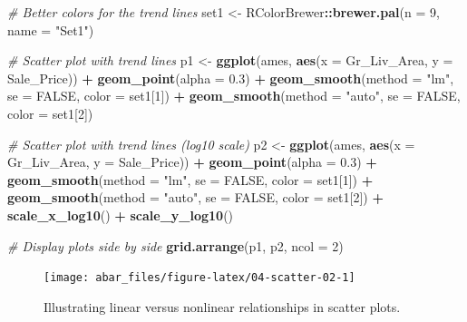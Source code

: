 \documentclass[]{book}
\newenvironment{Shaded}{\begin{snugshade}}{\end{snugshade}}
\newcommand{\CommentTok}[1]{\textcolor[rgb]{0.56,0.35,0.01}{\textit{#1}}}
\newcommand{\DataTypeTok}[1]{\textcolor[rgb]{0.13,0.29,0.53}{#1}}
\newcommand{\DecValTok}[1]{\textcolor[rgb]{0.00,0.00,0.81}{#1}}
\newcommand{\FloatTok}[1]{\textcolor[rgb]{0.00,0.00,0.81}{#1}}
\newcommand{\KeywordTok}[1]{\textcolor[rgb]{0.13,0.29,0.53}{\textbf{#1}}}
\newcommand{\NormalTok}[1]{#1}
\newcommand{\OperatorTok}[1]{\textcolor[rgb]{0.81,0.36,0.00}{\textbf{#1}}}
\newcommand{\OtherTok}[1]{\textcolor[rgb]{0.56,0.35,0.01}{#1}}
\newcommand{\StringTok}[1]{\textcolor[rgb]{0.31,0.60,0.02}{#1}}
\theoremstyle{definition}
\theoremstyle{definition}
\theoremstyle{definition}
\theoremstyle{remark}
\begin{document}
\begin{Shaded}
\begin{Highlighting}[]
\CommentTok{# Better colors for the trend lines}
\NormalTok{set1 <-}\StringTok{ }\NormalTok{RColorBrewer}\OperatorTok{::}\KeywordTok{brewer.pal}\NormalTok{(}\DataTypeTok{n =} \DecValTok{9}\NormalTok{, }\DataTypeTok{name =} \StringTok{"Set1"}\NormalTok{)}

\CommentTok{# Scatter plot with trend lines}
\NormalTok{p1 <-}\StringTok{ }\KeywordTok{ggplot}\NormalTok{(ames, }\KeywordTok{aes}\NormalTok{(}\DataTypeTok{x =}\NormalTok{ Gr_Liv_Area, }\DataTypeTok{y =}\NormalTok{ Sale_Price)) }\OperatorTok{+}
\StringTok{  }\KeywordTok{geom_point}\NormalTok{(}\DataTypeTok{alpha =} \FloatTok{0.3}\NormalTok{) }\OperatorTok{+}
\StringTok{  }\KeywordTok{geom_smooth}\NormalTok{(}\DataTypeTok{method =} \StringTok{"lm"}\NormalTok{, }\DataTypeTok{se =} \OtherTok{FALSE}\NormalTok{, }\DataTypeTok{color =}\NormalTok{ set1[}\DecValTok{1}\NormalTok{]) }\OperatorTok{+}
\StringTok{  }\KeywordTok{geom_smooth}\NormalTok{(}\DataTypeTok{method =} \StringTok{"auto"}\NormalTok{, }\DataTypeTok{se =} \OtherTok{FALSE}\NormalTok{, }\DataTypeTok{color =}\NormalTok{ set1[}\DecValTok{2}\NormalTok{])}

\CommentTok{# Scatter plot with trend lines (log10 scale)}
\NormalTok{p2 <-}\StringTok{ }\KeywordTok{ggplot}\NormalTok{(ames, }\KeywordTok{aes}\NormalTok{(}\DataTypeTok{x =}\NormalTok{ Gr_Liv_Area, }\DataTypeTok{y =}\NormalTok{ Sale_Price)) }\OperatorTok{+}
\StringTok{  }\KeywordTok{geom_point}\NormalTok{(}\DataTypeTok{alpha =} \FloatTok{0.3}\NormalTok{) }\OperatorTok{+}
\StringTok{  }\KeywordTok{geom_smooth}\NormalTok{(}\DataTypeTok{method =} \StringTok{"lm"}\NormalTok{, }\DataTypeTok{se =} \OtherTok{FALSE}\NormalTok{, }\DataTypeTok{color =}\NormalTok{ set1[}\DecValTok{1}\NormalTok{]) }\OperatorTok{+}
\StringTok{  }\KeywordTok{geom_smooth}\NormalTok{(}\DataTypeTok{method =} \StringTok{"auto"}\NormalTok{, }\DataTypeTok{se =} \OtherTok{FALSE}\NormalTok{, }\DataTypeTok{color =}\NormalTok{ set1[}\DecValTok{2}\NormalTok{]) }\OperatorTok{+}
\StringTok{  }\KeywordTok{scale_x_log10}\NormalTok{() }\OperatorTok{+}
\StringTok{  }\KeywordTok{scale_y_log10}\NormalTok{()}

\CommentTok{# Display plots side by side}
\KeywordTok{grid.arrange}\NormalTok{(p1, p2, }\DataTypeTok{ncol =} \DecValTok{2}\NormalTok{)}
\end{Highlighting}
\end{Shaded}

\begin{figure}

{\centering \texttt{[image: abar\_files/figure-latex/04-scatter-02-1]} 

}

\caption{Illustrating linear versus nonlinear relationships in scatter plots.}\label{fig:04-scatter-02}
\end{figure}
\end{document}
